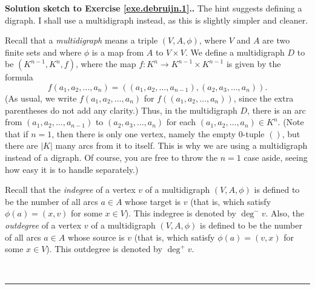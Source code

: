 \documentclass[numbers=enddot,12pt,final,onecolumn,notitlepage]{scrartcl}%
\theoremstyle{definition}
\newenvironment{proof}[1][Proof]{\noindent\textbf{#1.} }{\ \rule{0.5em}{0.5em}}
\newcommand{\abs}[1]{\left| #1 \right|}
\newcommand{\tup}[1]{\left( #1 \right)}
\begin{document}
\begin{proof}[Solution sketch to Exercise \ref{exe.debruijn.1}.]
The hint suggests defining a digraph. I shall use a multidigraph
instead, as this is slightly simpler and cleaner.

Recall that a \textit{multidigraph} means a triple
$\tup{V, A, \phi}$, where $V$ and $A$ are two finite sets and where
$\phi$ is a map from $A$ to $V \times V$. We define a multidigraph
$D$ to be $\tup{K^{n-1}, K^n, f}$, where the map
$f : K^n \to K^{n-1} \times K^{n-1}$ is given by the formula
\[
f\tup{a_1, a_2, \ldots, a_n}
= \tup{ \tup{a_1, a_2, \ldots, a_{n-1}},
        \tup{a_2, a_3, \ldots, a_n} }.
\]
(As usual, we write $f\tup{a_1, a_2, \ldots, a_n}$ for
$f\tup{\tup{a_1, a_2, \ldots, a_n}}$, since the extra parentheses do
not add any clarity.) Thus, in the multidigraph $D$, there is an arc
from $\tup{a_1, a_2, \ldots, a_{n-1}}$ to
$\tup{a_2, a_3, \ldots, a_n}$ for each
$\tup{a_1, a_2, \ldots, a_n} \in K^n$. (Note that if $n = 1$, then
there is only one vertex, namely the empty $0$-tuple $\tup{}$, but
there are $\abs{K}$ many arcs from it to itself. This is why we are
using a multidigraph instead of a digraph. Of course, you are free to
throw the $n = 1$ case aside, seeing how easy it is to handle
separately.)

Recall that the \textit{indegree} of a vertex $v$ of a multidigraph
$\tup{V, A, \phi}$ is defined to be the number of all arcs $a \in A$
whose target is $v$ (that is, which satisfy $\phi\tup{a} = \tup{x, v}$
for some $x \in V$). This indegree is denoted by $\deg^- v$.
Also, the \textit{outdegree} of a vertex $v$ of a multidigraph
$\tup{V, A, \phi}$ is defined to be the number of all arcs $a \in A$
whose source is $v$ (that is, which satisfy $\phi\tup{a} = \tup{v, x}$
for some $x \in V$). This outdegree is denoted by $\deg^+ v$.


\end{proof}
\end{document}
